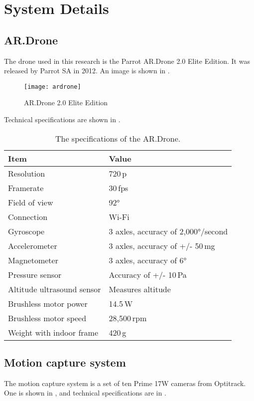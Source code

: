 \appendix
\chapter{System Details}
\section{AR.Drone}
The drone used in this research is the Parrot AR.Drone 2.0 Elite Edition.
It was released by Parrot SA in 2012.
An image is shown in .

\begin{figure}[h]
  \centering
  \texttt{[image: ardrone]}
  \caption[AR.Drone]{AR.Drone 2.0 Elite Edition}
  \label{fig:ardrone}
\end{figure}

Technical specifications are shown in .

\begin{table}[h]
  \centering
  \caption[AR.Drone specifications]{The specifications of the AR.Drone.}
  \begin{tabular}{ll}
    \toprule
    Item & Value \\
    \midrule
    Resolution & 720\,p\\
    Framerate & 30\,fps\\
    Field of view & 92°\\
    Connection & Wi-Fi\\
    Gyroscope  &	3 axles, accuracy of 2,000°/second\\
    Accelerometer  &	3 axles, accuracy of +/- 50\,mg\\
    Magnetometer  &	3 axles, accuracy of 6°\\
    Pressure sensor  & Accuracy of +/- 10\,Pa\\
    Altitude ultrasound sensor  & Measures altitude\\
    Brushless motor power & 14.5\,W\\
    Brushless motor speed & 28,500\,rpm\\
    Weight with indoor frame & 420\,g\\
    \bottomrule
  \end{tabular}
  \label{tab:ardrone_specs}
\end{table}

\section{Motion capture system}
The motion capture system is a set of ten Prime 17W cameras from Optitrack.
One is shown in , and technical specifications are in .

